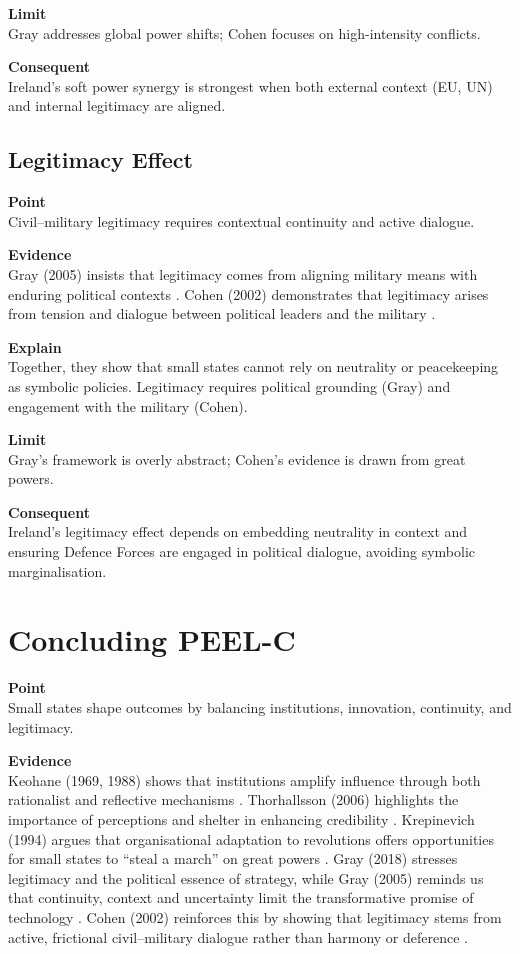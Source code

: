 \textbf{Limit} \\
Gray addresses global power shifts; Cohen focuses on high-intensity conflicts.

\textbf{Consequent} \\
Ireland’s soft power synergy is strongest when both external context (EU, UN) and internal legitimacy are aligned.  

\subsection*{Legitimacy Effect}

\textbf{Point} \\
Civil--military legitimacy requires contextual continuity and active dialogue.

\textbf{Evidence} \\
Gray (2005) insists that legitimacy comes from aligning military means with enduring political contexts \parencite{GRAY_2005}.  
Cohen (2002) demonstrates that legitimacy arises from tension and dialogue between political leaders and the military \parencite{COHEN_2002}.  

\textbf{Explain} \\
Together, they show that small states cannot rely on neutrality or peacekeeping as symbolic policies. Legitimacy requires political grounding (Gray) and engagement with the military (Cohen).

\textbf{Limit} \\
Gray’s framework is overly abstract; Cohen’s evidence is drawn from great powers.

\textbf{Consequent} \\
Ireland’s legitimacy effect depends on embedding neutrality in context and ensuring Defence Forces are engaged in political dialogue, avoiding symbolic marginalisation.

\section*{Concluding PEEL-C}

\textbf{Point} \\
Small states shape outcomes by balancing institutions, innovation, continuity, and legitimacy.  

\textbf{Evidence} \\
Keohane (1969, 1988) shows that institutions amplify influence through both rationalist and reflective mechanisms \parencite{KEOHANE_1969,KEOHANE_1988}.  
Thorhallsson (2006) highlights the importance of perceptions and shelter in enhancing credibility \parencite{THORHALLSSON_2006}.  
Krepinevich (1994) argues that organisational adaptation to revolutions offers opportunities for small states to ``steal a march'' on great powers \parencite{KREPINEVICH_1994}.  
Gray (2018) stresses legitimacy and the political essence of strategy, while Gray (2005) reminds us that continuity, context and uncertainty limit the transformative promise of technology \parencite{GRAY_2018,GRAY_2005}.  
Cohen (2002) reinforces this by showing that legitimacy stems from active, frictional civil--military dialogue rather than harmony or deference \parencite{COHEN_2002}.  

